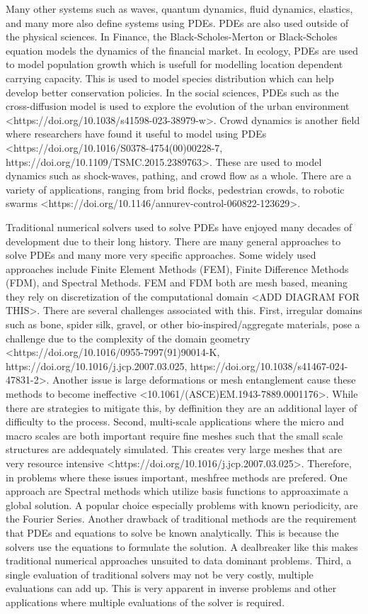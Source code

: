 Many other systems such as waves, quantum dynamics, fluid dynamics, elastics, and many more also define systems using PDEs. PDEs are also used outside of the physical sciences. In Finance, the Black-Scholes-Merton or Black-Scholes equation models the dynamics of the financial market. In ecology, PDEs are used to model population growth which is usefull for modelling location dependent carrying capacity. This is used to model species distribution which can help develop better conservation policies. In the social sciences, PDEs such as the cross-diffusion model is used to explore the evolution of the urban environment <https://doi.org/10.1038/s41598-023-38979-w>. Crowd dynamics is another field where researchers have found it useful to model using PDEs <https://doi.org/10.1016/S0378-4754(00)00228-7, https://doi.org/10.1109/TSMC.2015.2389763>. These are used to model dynamics such as shock-waves, pathing, and crowd flow as a whole. There are a variety of applications, ranging from brid flocks, pedestrian crowds, to robotic swarms <https://doi.org/10.1146/annurev-control-060822-123629>.


Traditional numerical solvers used to solve PDEs have enjoyed many decades of development due to their long history. There are many general approaches to solve PDEs and many more very specific approaches. Some widely used approaches include Finite Element Methods (FEM), Finite Difference Methods (FDM), and Spectral Methods. FEM and FDM both are mesh based, meaning they rely on discretization of the computational domain <ADD DIAGRAM FOR THIS>. There are several challenges associated with this. First, irregular domains such as bone, spider silk, gravel, or other bio-inspired/aggregate materials,  pose a challenge due to the complexity of the domain geometry <https://doi.org/10.1016/0955-7997(91)90014-K, https://doi.org/10.1016/j.jcp.2007.03.025, https://doi.org/10.1038/s41467-024-47831-2>. Another issue is large deformations or mesh entanglement cause these methods to become ineffective <10.1061/(ASCE)EM.1943-7889.0001176>. While there are strategies to mitigate this, by deffinition they are an additional layer of difficulty to the process. Second, multi-scale applications where the micro and macro scales are both important require fine meshes such that the small scale structures are addequately simulated. This creates very large meshes that are very resource intensive <https://doi.org/10.1016/j.jcp.2007.03.025>. Therefore, in problems where these issues important, meshfree methods are prefered. One approach are Spectral methods which utilize basis functions to approaximate a global solution. A popular choice especially problems with known periodicity, are the Fourier Series. Another drawback of traditional methods are the requirement that PDEs and equations to solve be known analytically. This is because the solvers use the equations to formulate the solution. A dealbreaker like this makes traditional numerical approaches unsuited to data dominant problems. Third, a single evaluation of traditional solvers may not be very costly, multiple evaluations can add up. This is very apparent in inverse problems and other applications where multiple evaluations of the solver is required.

